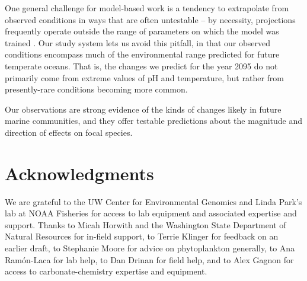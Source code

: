 \documentclass[11pt]{article}
\begin{document}
\begin{linenumbers}
One general challenge for model-based work is a tendency to extrapolate from observed conditions in ways that are often untestable -- by necessity, projections frequently operate outside the range of parameters on which the model was trained \cite{fitzpatrick2009projection}. Our study system lets us avoid this pitfall, in that our observed conditions encompass much of the environmental range predicted for future temperate oceans. That is, the changes we predict for the year 2095 do not primarily come from extreme values of pH and temperature, but rather from presently-rare conditions becoming more common. 

Our observations are strong evidence of the kinds of changes likely in future marine communities, and they offer testable predictions about the magnitude and direction of effects on focal species. 







\section{Acknowledgments}

 We are grateful to the UW Center for Environmental Genomics and Linda Park's lab at NOAA Fisheries for access to lab equipment and associated expertise and support. Thanks to Micah Horwith and the Washington State Department of Natural Resources for in-field support, to Terrie Klinger for feedback on an earlier draft, to Stephanie Moore for advice on phytoplankton generally, to Ana Ram\'{o}n-Laca for lab help, to Dan Drinan for field help, and to Alex Gagnon for access to carbonate-chemistry expertise and equipment.



 \end{linenumbers}
\end{document}
